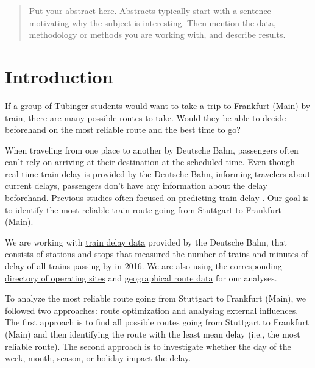 \documentclass{article}
\theoremstyle{plain}
\theoremstyle{definition}
\theoremstyle{remark}
\begin{document}
\printAffiliationsAndNotice{\icmlEqualContribution} %

\begin{abstract}
Put your abstract here. Abstracts typically start with a sentence motivating why the subject is interesting. Then mention the data, methodology or methods you are working with, and describe results. 
\end{abstract}

\section{Introduction}\label{sec:intro}
If a group of Tübinger students would want to take a trip to Frankfurt (Main) by train, there are many possible routes to take. Would they be able to decide beforehand on the most reliable route and the best time to go?

When traveling from one place to another by Deutsche Bahn, passengers often can't rely on arriving at their destination at the scheduled time. Even though real-time train delay is provided by the Deutsche Bahn, informing travelers about current delays, passengers don't have any information about the delay beforehand. Previous studies often focused on predicting train delay \cite{predtraindelay}. Our goal is to identify the most reliable train route going from Stuttgart to Frankfurt (Main).

We are working with \href{https://data.deutschebahn.com/dataset/ist-verkehrsdaten-der-db-cargo-auf-bst8-ebene.html}{train delay data} provided by the Deutsche Bahn, that consists of stations and stops that measured the number of trains and minutes of delay of all trains passing by in 2016. We are also using the corresponding \href{https://data.deutschebahn.com/dataset/betriebsstellen-gueterverkehr.html}{directory of operating sites} and \href{https://data.deutschebahn.com/dataset/betriebsstellen-gueterverkehr.html}{geographical route data} for our analyses.

To analyze the most reliable route going from Stuttgart to Frankfurt (Main), we followed two approaches: route optimization and analysing external influences. The first approach is to find all possible routes going from Stuttgart to Frankfurt (Main) and then identifying the route with the least mean delay (i.e., the most reliable route). The second approach is to investigate whether the day of the week, month, season, or holiday impact the delay.
\end{document}
